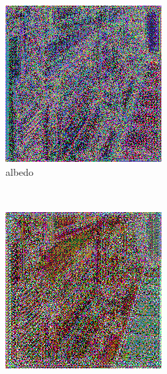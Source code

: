 \begin{figure}[h!]
    \centering
    \begin{subfigure}[b]{0.175\textwidth}
     \includegraphics[width=\textwidth]{figures/result/single/albedo/1.png}
     \caption{albedo}\label{subfig:1}
    \end{subfigure}
    ~
    \begin{subfigure}[b]{0.175\textwidth}
     \includegraphics[width=\textwidth]{figures/result/single/depth/1.png}

\end{subfigure}
\end{figure}
